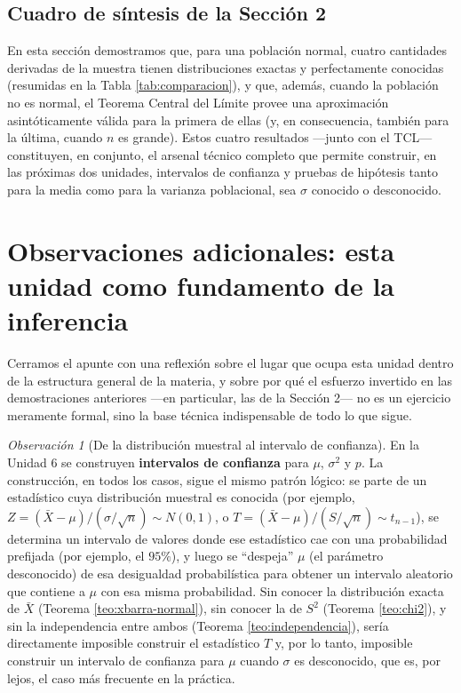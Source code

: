 \documentclass[11pt,a4paper]{article}
\theoremstyle{plain}
\theoremstyle{definition}
\theoremstyle{remark}
\newtheorem{observacion}[teorema]{Observación}
\begin{document}
\subsection{Cuadro de síntesis de la Sección 2}

En esta sección demostramos que, para una población normal, cuatro cantidades derivadas de la muestra tienen distribuciones exactas y perfectamente conocidas (resumidas en la Tabla \ref{tab:comparacion}), y que, además, cuando la población no es normal, el Teorema Central del Límite provee una aproximación asintóticamente válida para la primera de ellas (y, en consecuencia, también para la última, cuando $n$ es grande). Estos cuatro resultados —junto con el TCL— constituyen, en conjunto, el arsenal técnico completo que permite construir, en las próximas dos unidades, intervalos de confianza y pruebas de hipótesis tanto para la media como para la varianza poblacional, sea $\sigma$ conocido o desconocido.

\section{Observaciones adicionales: esta unidad como fundamento de la inferencia}

Cerramos el apunte con una reflexión sobre el lugar que ocupa esta unidad dentro de la estructura general de la materia, y sobre por qué el esfuerzo invertido en las demostraciones anteriores —en particular, las de la Sección 2— no es un ejercicio meramente formal, sino la base técnica indispensable de todo lo que sigue.

\begin{observacion}[De la distribución muestral al intervalo de confianza]
En la Unidad 6 se construyen \textbf{intervalos de confianza} para $\mu$, $\sigma^2$ y $p$. La construcción, en todos los casos, sigue el mismo patrón lógico: se parte de un estadístico cuya distribución muestral es conocida (por ejemplo, $Z=(\bar X-\mu)/(\sigma/\sqrt n)\sim N(0,1)$, o $T=(\bar X-\mu)/(S/\sqrt n)\sim t_{n-1}$), se determina un intervalo de valores donde ese estadístico cae con una probabilidad prefijada (por ejemplo, el $95\%$), y luego se ``despeja'' $\mu$ (el parámetro desconocido) de esa desigualdad probabilística para obtener un intervalo aleatorio que contiene a $\mu$ con esa misma probabilidad. Sin conocer la distribución exacta de $\bar X$ (Teorema \ref{teo:xbarra-normal}), sin conocer la de $S^2$ (Teorema \ref{teo:chi2}), y sin la independencia entre ambos (Teorema \ref{teo:independencia}), sería directamente imposible construir el estadístico $T$ y, por lo tanto, imposible construir un intervalo de confianza para $\mu$ cuando $\sigma$ es desconocido, que es, por lejos, el caso más frecuente en la práctica.
\end{observacion}
\end{document}
